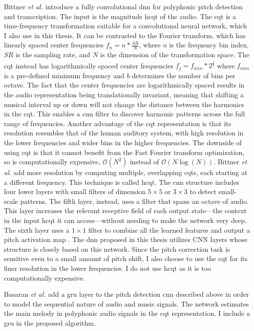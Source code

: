 Bittner \textit{et al.} introduce a fully convolutional \gls{dnn} for polyphonic pitch detection and transcription. The input is the magnitude \gls{hcqt} of the audio. The \gls{cqt} is a time-frequency transformation suitable for a convolutional neural network, which I also use in this thesis. It can be contrasted to the Fourier transform, which has linearly spaced center frequencies $f_n = n * \frac{SR}{N}$, where $n$ is the frequency bin index, $SR$ is the sampling rate, and $N$ is the dimension of the transformation space. The \gls{cqt} instead has logarithmically spaced center frequencies $f_j = f_{min} * 2^{\frac{j}{b}}$ where $f_{min}$ is a pre-defined minimum frequency and $b$ determines the number of bins per octave. The fact that the center frequencies are logarithmically spaced results in the audio representation being translationally invariant, meaning that shifting a musical interval up or down will not change the distance between the harmonics in the \gls{cqt}. This enables a \gls{cnn} filter to discover harmonic patterns across the full range of frequencies. Another advantage of the \gls{cqt} representation is that its resolution resembles that of the human auditory system, with high resolution in the lower frequencies and wider bins in the higher frequencies. The downside of using \gls{cqt} is that it cannot benefit from the Fast Fourier transform optimization, so is computationally expensive, $\mathcal{O}(N^2)$ instead of $\mathcal{O}(N \log (N))$. Bittner \textit{et al.} add more resolution by computing multiple, overlapping \gls{cqt}s, each starting at a different frequency. This technique is called \gls{hcqt}. The \gls{cnn} structure includes four lower layers with small filters of dimension $5 \times 5$ or $3 \times 3$ to detect small-scale patterns. The fifth layer, instead, uses a filter that spans an octave of audio. This layer increases the relevant receptive field of each output state---the context in the input \gls{hcqt} it can access---without needing to make the network very deep. The sixth layer uses a $1 \times 1$ filter to combine all the learned features and output a pitch activation map \cite{bittner2017deep}. The \gls{dnn} proposed in this thesis utilizes CNN layers whose structure is closely based on this network. Since the pitch correction task is sensitive even to a small amount of pitch shift, I also choose to use the \gls{cqt} for its finer resolution in the lower frequencies. I do not use \gls{hcqt} as it is too computationally expensive.

Basaran {\it et al.} add a \gls{gru} layer \cite{chung2014empirical, ChoK2014arxiv} to the pitch detection \gls{cnn} described above in order to model the sequential nature of \cite{basaranmain} audio and music signals. The network estimates the main melody in polyphonic audio signals in the \gls{cqt} representation. I include a \gls{gru} in the proposed algorithm.

